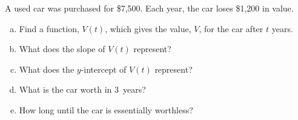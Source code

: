\documentclass[11pt,letterpaper]{article}
\begin{document}
\newpage



 A used car was purchased for \$7,500. Each year, the car loses \$1,200 in value.
        \begin{enumerate}[(a)]
        \item Find a function, $V(t)$, which gives the value, $V$, for the car after $t$ years.
        \item What does the slope of $V(t)$ represent?
        \item What does the $y$-intercept of $V(t)$ represent?
        \item What is the car worth in 3~years?
        \item How long until the car is essentially worthless? 
        \end{enumerate}
\end{document}
